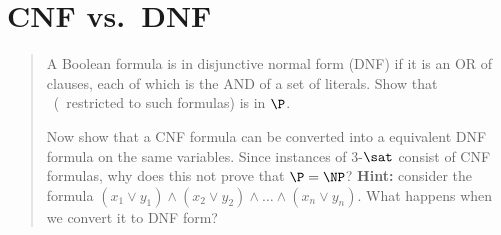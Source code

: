 \section*{CNF vs.\ DNF }
    \begin{quote}
    A Boolean formula is in disjunctive normal form (DNF) if it is an OR of clauses,
    each of which is the AND of a set of literals.
    Show that \dnfsat\ (\sat\ restricted to such formulas) is in $\P$.

    Now show that a CNF formula can be converted into a equivalent DNF formula on the same variables.
    Since instances of 3-$\sat$ consist of CNF formulas, why does this not prove that $\P = \NP$?
    {\bf Hint:} consider the formula $(x_1 \vee  y_1) \wedge (x_2 \vee y_2) \wedge \ldots \wedge (x_n \vee y_n).$
    What happens when we convert it to DNF form?
    \end{quote}


